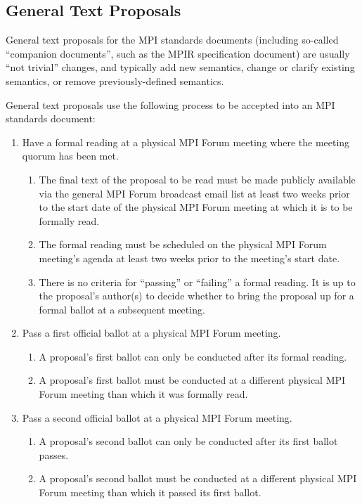 
\subsection{General Text Proposals}

General text proposals for the MPI standards documents (including
so-called ``companion documents'', such as the MPIR specification
document) are usually ``not trivial'' changes, and typically add new
semantics, change or clarify existing semantics, or remove
previously-defined semantics.

General text proposals use the following process to be accepted into
an MPI standards document:

\begin{enumerate}
\item Have a formal reading at a physical MPI Forum meeting where the
  meeting quorum has been met.
  \begin{enumerate}
  \item The final text of the proposal to be read must be made
    publicly available via the general MPI Forum broadcast email list
    at least two weeks prior to the start date of the physical MPI
    Forum meeting at which it is to be formally read.
  \item The formal reading must be scheduled on the physical MPI Forum
    meeting's agenda at least two weeks prior to the meeting's start
    date.
  \item There is no criteria for ``passing'' or ``failing'' a formal
    reading.  It is up to the proposal's author(s) to decide whether
    to bring the proposal up for a formal ballot at a subsequent
    meeting.
  \end{enumerate}

\item Pass a first official ballot at a physical MPI Forum meeting.
  \begin{enumerate}
  \item A proposal's first ballot can only be conducted after its
    formal reading.
  \item A proposal's first ballot must be conducted at a different
    physical MPI Forum meeting than which it was formally read.
  \end{enumerate}

\item Pass a second official ballot at a physical MPI Forum meeting.
  \begin{enumerate}
  \item A proposal's second ballot can only be conducted after its
    first ballot passes.
  \item A proposal's second ballot must be conducted at a different
    physical MPI Forum meeting than which it passed its first ballot.
  \end{enumerate}


\end{enumerate}
